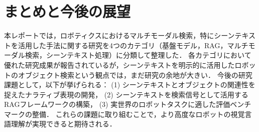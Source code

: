 \section{まとめと今後の展望}
本レポートでは，ロボティクスにおけるマルチモーダル検索，特にシーンテキストを活用した手法に関する研究を4つのカテゴリ（基盤モデル，RAG，マルチモーダル検索，シーンテキスト処理）に分類して整理した．
各カテゴリにおいて優れた研究成果が報告されているが，シーンテキストを明示的に活用したロボットのオブジェクト検索という観点では，まだ研究の余地が大きい．
今後の研究課題として，以下が挙げられる：
(1) シーンテキストとオブジェクトの関連性を捉えたナラティブ表現の開発，
(2) シーンテキストを検索信号として活用するRAGフレームワークの構築，
(3) 実世界のロボットタスクに適した評価ベンチマークの整備．
これらの課題に取り組むことで，より高度なロボットの視覚言語理解が実現できると期待される．

